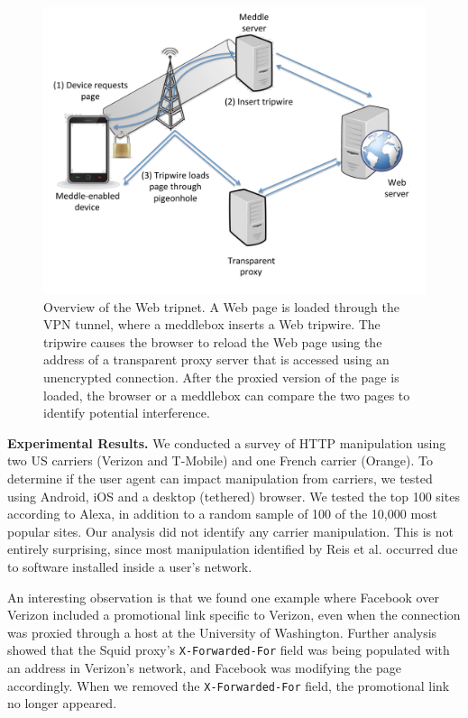 \begin{figure}
\centering
        \includegraphics[width=\linewidth]{figs/tripnet.pdf}
\vspace{-2em}
  \caption{Overview of the \meddle Web tripnet. A Web page is loaded 
through the VPN tunnel, where a meddlebox inserts a Web tripwire. The 
tripwire causes the browser to reload the Web page using the address of a
transparent proxy server that is accessed using an unencrypted connection. 
After the proxied version of the page is loaded, the browser or a meddlebox 
can compare the two pages to identify potential interference. }
  \label{fig:tripnet}
\vspace{-2em}
\end{figure}

\noindent\textbf{Experimental Results.} We conducted a survey of HTTP manipulation using two US carriers (Verizon and T-Mobile) 
and one French carrier (Orange). To determine if the user agent can impact manipulation from 
carriers, we tested using Android, iOS and a desktop (tethered) browser. We tested the top 
100 sites according to Alexa, in addition to a random sample of 100 of the 10,000 most popular 
sites. Our analysis did not identify any carrier manipulation. This is not entirely surprising, 
since most manipulation identified by Reis et al. occurred due to software installed inside 
a user's network.

An interesting observation is that 
we found one example where Facebook over Verizon included a promotional link specific to 
Verizon, even when the connection was proxied through a host at the University of Washington. 
Further analysis showed that the Squid proxy's {\tt X-Forwarded-For} field was being populated 
with an address in Verizon's network, and Facebook was modifying the page accordingly. When 
we removed the {\tt X-Forwarded-For} field, the promotional link no longer appeared. 

